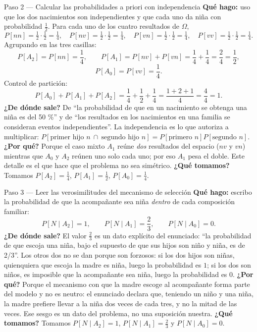 \documentclass[11pt]{article}
\begin{document}
\begin{sol}
\begin{paso}{Paso 2 --- Calcular las probabilidades a priori con independencia}
\textbf{Qu\'e hago:} uso que los dos nacimientos son independientes y que cada uno da ni\~na con probabilidad $\tfrac12$. Para cada uno de los cuatro resultados de $\Omega$,
\[
P[nn]=\tfrac12\cdot\tfrac12=\tfrac14,\quad
P[nv]=\tfrac12\cdot\tfrac12=\tfrac14,\quad
P[vn]=\tfrac12\cdot\tfrac12=\tfrac14,\quad
P[vv]=\tfrac12\cdot\tfrac12=\tfrac14 .
\]
Agrupando en las tres casillas:
\[
P[A_2]=P[nn]=\frac14,
\qquad
P[A_1]=P[nv]+P[vn]=\frac14+\frac14=\frac24=\frac12,
\]
\[
P[A_0]=P[vv]=\frac14 .
\]
Control de partici\'on:
\[
P[A_0]+P[A_1]+P[A_2]=\frac14+\frac12+\frac14=\frac{1+2+1}{4}=\frac44=1 .
\]
\textbf{¿De d\'onde sale?} De ``la probabilidad de que en un nacimiento se obtenga una ni\~na es del 50 \%'' y de ``los resultados en los nacimientos en una familia se consideran eventos independientes''. La independencia es lo que autoriza a multiplicar: $P[\text{primer hijo }n\ \cap\ \text{segundo hijo }n]=P[\text{primero }n]P[\text{segundo }n]$.
\textbf{¿Por qu\'e?} Porque el caso mixto $A_1$ re\'une \emph{dos} resultados del espacio ($nv$ y $vn$) mientras que $A_0$ y $A_2$ re\'unen uno solo cada uno; por eso $A_1$ pesa el doble. Este detalle es el que hace que el problema no sea sim\'etrico.
\textbf{¿Qu\'e tomamos?} Tomamos $P[A_2]=\tfrac14$, $P[A_1]=\tfrac12$, $P[A_0]=\tfrac14$.
\end{paso}

\begin{paso}{Paso 3 --- Leer las verosimilitudes del mecanismo de selecci\'on}
\textbf{Qu\'e hago:} escribo la probabilidad de que la acompa\~nante sea ni\~na \emph{dentro} de cada composici\'on familiar:
\[
P[N\mid A_2]=1,
\qquad
P[N\mid A_1]=\frac{2}{3},
\qquad
P[N\mid A_0]=0 .
\]
\textbf{¿De d\'onde sale?} El valor $\tfrac23$ es un dato expl\'icito del enunciado: ``la probabilidad de que escoja una ni\~na, bajo el supuesto de que sus hijos son ni\~no y ni\~na, es de 2/3''. Los otros dos no se dan porque son forzosos: si los dos hijos son ni\~nas, quienquiera que escoja la madre es ni\~na, luego la probabilidad es $1$; si los dos son ni\~nos, es imposible que la acompa\~nante sea ni\~na, luego la probabilidad es $0$.
\textbf{¿Por qu\'e?} Porque el mecanismo con que la madre escoge al acompa\~nante forma parte del modelo y no es neutro: el enunciado declara que, teniendo un ni\~no y una ni\~na, la madre prefiere llevar a la ni\~na dos veces de cada tres, y no la mitad de las veces. Ese sesgo es un dato del problema, no una suposici\'on nuestra.
\textbf{¿Qu\'e tomamos?} Tomamos $P[N\mid A_2]=1$, $P[N\mid A_1]=\tfrac23$ y $P[N\mid A_0]=0$.
\end{paso}


\end{sol}
\end{document}
